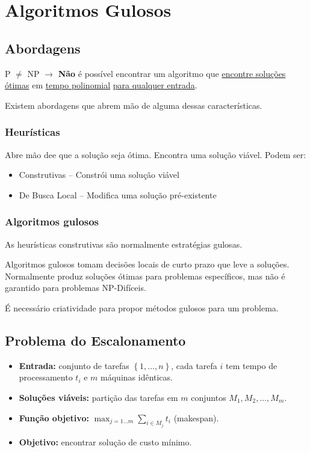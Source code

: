 \chapter{Algoritmos Gulosos}
\label{chp:semana2}

\section{Abordagens}

P $\neq$ NP $\to$ \textbf{Não} é possível encontrar um algoritmo que \underline{encontre soluções ótimas} em \underline{tempo polinomial} \underline{para qualquer entrada}.

Existem abordagens que abrem mão de alguma dessas características.

\subsection{Heurísticas}

Abre mão dee que a solução seja ótima. Encontra uma solução viável. Podem ser:

\begin{itemize}
    \item Construtivas -- Constrói uma solução viável
    \item De Busca Local -- Modifica uma solução pré-existente
\end{itemize}

\subsection{Algoritmos gulosos}

As heurísticas construtivas são normalmente estratégias gulosas.

Algoritmos gulosos tomam decisões locais de curto prazo que leve a soluções. Normalmente produz soluções ótimas para problemas específicos, mas não é garantido para problemas NP-Difíceis.

É necessário criatividade para propor métodos gulosos para um problema.

\section{Problema do Escalonamento}

\begin{itemize}
    \item \textbf{Entrada:} conjunto de tarefas $\left\{ 1,\dots,n\right\}$, cada tarefa $i$ tem tempo de processamento $t_i$ e $m$ máquinas idênticas.
    \item \textbf{Soluções viáveis:} partição das tarefas em $m$ conjuntos $M_1, M_2, \dots, M_m$.
    \item \textbf{Função objetivo:} $\max_{j=1\dots m}\sum_{i \in M_j}t_i$ (makespan).
    \item \textbf{Objetivo:} encontrar solução de custo mínimo.
\end{itemize}

